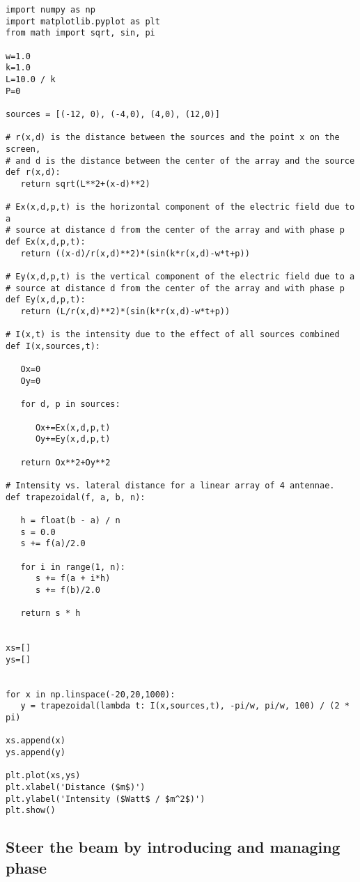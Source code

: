 \begin{Verbatim}[fontsize=\small,baselinestretch=0.9]
import numpy as np
import matplotlib.pyplot as plt
from math import sqrt, sin, pi

w=1.0
k=1.0
L=10.0 / k
P=0

sources = [(-12, 0), (-4,0), (4,0), (12,0)]

# r(x,d) is the distance between the sources and the point x on the screen,
# and d is the distance between the center of the array and the source
def r(x,d):
   return sqrt(L**2+(x-d)**2)

# Ex(x,d,p,t) is the horizontal component of the electric field due to a
# source at distance d from the center of the array and with phase p
def Ex(x,d,p,t):
   return ((x-d)/r(x,d)**2)*(sin(k*r(x,d)-w*t+p))

# Ey(x,d,p,t) is the vertical component of the electric field due to a
# source at distance d from the center of the array and with phase p
def Ey(x,d,p,t):
   return (L/r(x,d)**2)*(sin(k*r(x,d)-w*t+p))

# I(x,t) is the intensity due to the effect of all sources combined
def I(x,sources,t):

   Ox=0
   Oy=0

   for d, p in sources:

      Ox+=Ex(x,d,p,t)
      Oy+=Ey(x,d,p,t)

   return Ox**2+Oy**2

# Intensity vs. lateral distance for a linear array of 4 antennae.
def trapezoidal(f, a, b, n):

   h = float(b - a) / n
   s = 0.0
   s += f(a)/2.0

   for i in range(1, n):
      s += f(a + i*h)
      s += f(b)/2.0

   return s * h


xs=[]
ys=[]


for x in np.linspace(-20,20,1000):
   y = trapezoidal(lambda t: I(x,sources,t), -pi/w, pi/w, 100) / (2 * pi)

xs.append(x)
ys.append(y)

plt.plot(xs,ys)
plt.xlabel('Distance ($m$)')
plt.ylabel('Intensity ($Watt$ / $m^2$)')
plt.show()   
\end{Verbatim}

\subsection{Steer the beam by introducing and managing phase}

